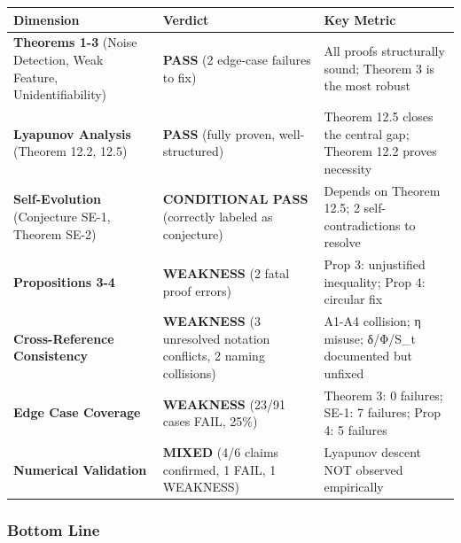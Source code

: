 \documentclass[
  12pt,
]{ctexart}
\begin{document}
\begin{longtable}[]{@{}
  >{\raggedright\arraybackslash}p{}
  >{\raggedright\arraybackslash}p{}
  >{\raggedright\arraybackslash}p{}@{}}
\toprule\noalign{}
\begin{minipage}[b]{\linewidth}\raggedright
Dimension
\end{minipage} & \begin{minipage}[b]{\linewidth}\raggedright
Verdict
\end{minipage} & \begin{minipage}[b]{\linewidth}\raggedright
Key Metric
\end{minipage} \\
\midrule\noalign{}
\endhead
\bottomrule\noalign{}
\endlastfoot
\textbf{Theorems 1-3} (Noise Detection, Weak Feature, Unidentifiability)
& \textbf{PASS} (2 edge-case failures to fix) & All proofs structurally
sound; Theorem 3 is the most robust \\
\textbf{Lyapunov Analysis} (Theorem 12.2, 12.5) & \textbf{PASS} (fully
proven, well-structured) & Theorem 12.5 closes the central gap; Theorem
12.2 proves necessity \\
\textbf{Self-Evolution} (Conjecture SE-1, Theorem SE-2) &
\textbf{CONDITIONAL PASS} (correctly labeled as conjecture) & Depends on
Theorem 12.5; 2 self-contradictions to resolve \\
\textbf{Propositions 3-4} & \textbf{WEAKNESS} (2 fatal proof errors) &
Prop 3: unjustified inequality; Prop 4: circular fix \\
\textbf{Cross-Reference Consistency} & \textbf{WEAKNESS} (3 unresolved
notation conflicts, 2 naming collisions) & A1-A4 collision; η misuse;
δ/Φ/S\_t documented but unfixed \\
\textbf{Edge Case Coverage} & \textbf{WEAKNESS} (23/91 cases FAIL, 25\%)
& Theorem 3: 0 failures; SE-1: 7 failures; Prop 4: 5 failures \\
\textbf{Numerical Validation} & \textbf{MIXED} (4/6 claims confirmed, 1
FAIL, 1 WEAKNESS) & Lyapunov descent NOT observed empirically \\
\end{longtable}

\subsubsection{Bottom Line}\label{bottom-line}
\end{document}
